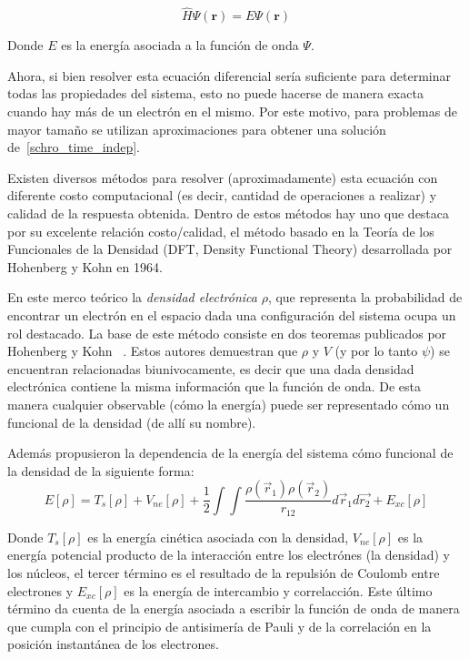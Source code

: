\begin{equation}
    \label{schro_time_indep}
    \hat{H} \Psi(\mathbf{r}) = E \Psi(\mathbf{r})
\end{equation}

Donde $E$ es la energ\'ia asociada a la funci\'on de onda $\Psi$.

Ahora, si bien resolver esta ecuaci\'on diferencial ser\'ia suficiente para determinar todas las propiedades del sistema, esto no puede hacerse de
manera exacta cuando hay m\'as de un electr\'on en el mismo. Por este motivo, para problemas de mayor tama\~no se utilizan aproximaciones 
para obtener una soluci\'on de~\ref{schro_time_indep}.

Existen diversos m\'etodos para resolver (aproximadamente) esta ecuaci\'on con diferente costo computacional (es decir, cantidad de operaciones a realizar)
y calidad de la respuesta obtenida. Dentro de estos m\'etodos hay uno que destaca por su excelente relaci\'on costo/calidad, el m\'etodo basado en la Teor\'ia de los Funcionales de la Densidad 
(DFT, Density Functional Theory) desarrollada por Hohenberg y Kohn en 1964.

En este merco te\'orico la \textit{densidad electr\'onica} $\rho$, que representa la probabilidad de encontrar un electr\'on en
el espacio dada una configuraci\'on del sistema ocupa un rol destacado.
La base de este m\'etodo consiste en dos teoremas publicados por Hohenberg y Kohn ~\cite{HohenbergKohn}.
Estos autores demuestran que $\rho$ y $V$ (y por lo tanto $\psi$) se encuentran relacionadas biunivocamente, 
es decir que una dada densidad electr\'onica contiene la misma informaci\'on que la funci\'on de onda.
De esta manera cualquier observable (c\'omo la energ\'ia) puede ser representado c\'omo un funcional de la densidad (de all\'i su nombre).

Adem\'as propusieron la dependencia de la energ\'ia del sistema c\'omo funcional de la densidad de la siguiente forma:
\begin{equation}
    \label{hohenberg_kohn_energy}
    E[\rho] = T_s[\rho] + V_{ne}[\rho] + \frac{1}{2} \int \int \frac{\rho(\vec{r}_1) \rho(\vec{r}_2)}{r_{12}} d\vec{r}_1 d\vec{r_2} + E_{xc}[\rho]
\end{equation}

Donde $T_s[\rho]$ es la energ\'ia cin\'etica asociada con la densidad, $V_{ne}[\rho]$ es la energ\'ia potencial producto de la interacci\'on entre los
electr\'ones (la densidad) y los n\'ucleos, el tercer t\'ermino es el resultado de la repulsi\'on de Coulomb entre electrones y $E_{xc}[\rho]$ es la
energ\'ia de intercambio y correlacci\'on. Este \'ultimo t\'ermino da cuenta de la energ\'ia asociada a escribir la funci\'on de onda de manera que cumpla con el principio de antisimer\'ia de Pauli y de la correlaci\'on
en la posici\'on instant\'anea de los electrones.

